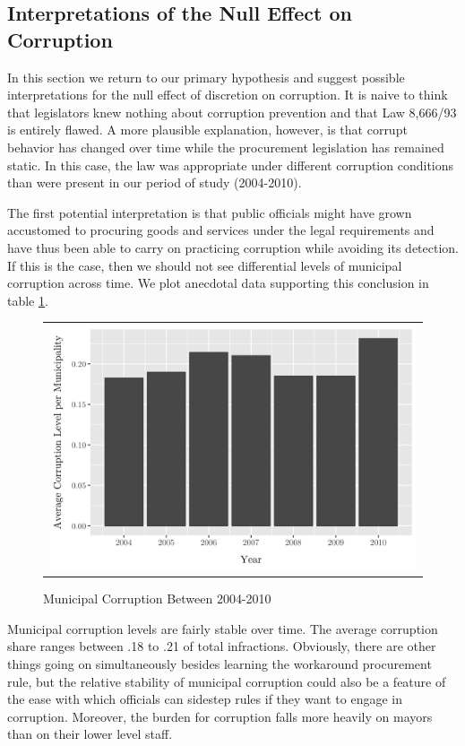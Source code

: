 \documentclass[11pt]{article}
\begin{document}
\subsection{Interpretations of the Null Effect on Corruption} \label{subsec:nullcorruption}

In this section we return to our primary hypothesis and suggest possible interpretations for the null effect of discretion on corruption. It is naive to think that legislators knew nothing about corruption prevention and that Law 8,666/93 is entirely flawed. A more plausible explanation, however, is that corrupt behavior has changed over time while the procurement legislation has remained static. In this case, the law was appropriate under different corruption conditions than were present in our period of study (2004-2010).

The first potential interpretation is that public officials might have grown accustomed to procuring goods and services under the legal requirements and have thus been able to carry on practicing corruption while avoiding its detection. If this is the case, then we should not see differential levels of municipal corruption across time. We plot anecdotal data supporting this conclusion in table \ref{fig:01discussion}.

\begin{figure}[!htbp]
  \caption{Municipal Corruption Between 2004-2010}
  \label{fig:01discussion}
  \centering
  \small
  \begin{tabular}{c}
  \includegraphics[scale = .14]{01discussionplot}
  \end{tabular}
\end{figure}

Municipal corruption levels are fairly stable over time. The average corruption share ranges between .18 to .21 of total infractions. Obviously, there are other things going on simultaneously besides learning the workaround procurement rule, but the relative stability of municipal corruption could also be a feature of the ease with which officials can sidestep rules if they want to engage in corruption. Moreover, the burden for corruption falls more heavily on mayors \citep{FinanGovernmentAuditsReduce2018} than on their lower level staff.
\end{document}
